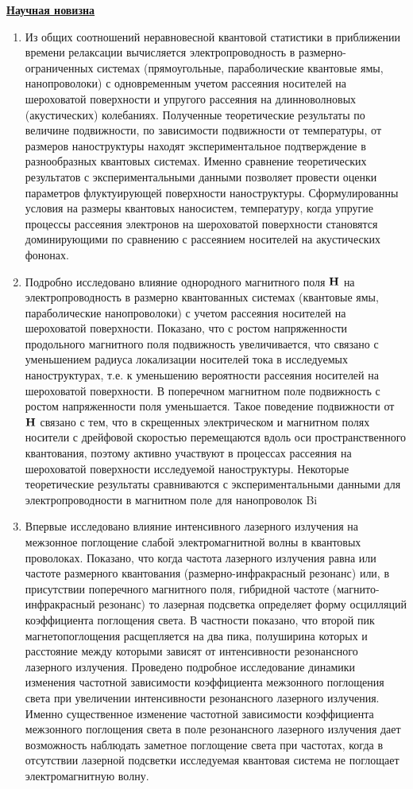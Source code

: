 \underline{\textbf{Научная новизна}}
\begin{enumerate}
	\item Из общих соотношений неравновесной квантовой статистики в приближении времени релаксации вычисляется электропроводность в размерно-ограниченных системах (прямоугольные, параболические квантовые ямы, нанопроволоки) с одновременным учетом рассеяния носителей на шероховатой поверхности и упругого рассеяния на длинноволновых (акустических) колебаниях. Полученные теоретические результаты по величине подвижности, по зависимости подвижности от температуры,  от размеров наноструктуры находят экспериментальное подтверждение в разнообразных квантовых системах. Именно сравнение теоретических результатов с экспериментальными данными позволяет провести оценки параметров флуктуирующей поверхности наноструктуры. Сформулированны условия на размеры квантовых наносистем, температуру, когда упругие процессы рассеяния электронов на шероховатой поверхности становятся доминирующими по сравнению с рассеянием носителей на акустических фононах.
	\item Подробно исследовано влияние однородного магнитного поля $\boldsymbol{\mathbf{H}}$ на электропроводность в размерно квантованных системах (квантовые ямы, параболические нанопроволоки) с учетом рассеяния носителей на шероховатой поверхности. Показано, что с ростом напряженности продольного магнитного поля подвижность увеличивается, что связано с уменьшением радиуса локализации носителей тока в исследуемых наноструктурах, т.е. к уменьшению вероятности рассеяния носителей на шероховатой поверхности. В поперечном магнитном поле подвижность с ростом напряженности поля уменьшается. Такое поведение подвижности от $\boldsymbol{\mathbf{H}}$ связано с тем, что в скрещенных электрическом и магнитном полях носители с дрейфовой скоростью перемещаются вдоль оси пространственного квантования, поэтому активно участвуют в процессах рассеяния на шероховатой поверхности исследуемой наноструктуры. Некоторые теоретические результаты сравниваются с экспериментальными данными для электропроводности в магнитном поле для нанопроволок Bi
	\item Впервые исследовано влияние интенсивного лазерного излучения на межзонное поглощение слабой электромагнитной волны в квантовых проволоках. Показано, что когда частота лазерного излучения равна или частоте размерного квантования (размерно-инфракрасный резонанс) или, в присутствии поперечного магнитного поля, гибридной частоте (магнито-инфракрасный резонанс) то лазерная подсветка определяет форму осцилляций коэффициента поглощения света. В частности показано, что второй пик магнетопоглощения расщепляется на два пика, полуширина которых и расстояние между которыми зависят от интенсивности резонансного лазерного излучения. Проведено подробное исследование динамики изменения частотной зависимости коэффициента межзонного поглощения света при увеличении интенсивности резонансного лазерного излучения. Именно существенное изменение частотной зависимости коэффициента межзонного поглощения света в поле резонансного лазерного излучения дает возможность наблюдать заметное поглощение света при частотах, когда в отсутствии лазерной подсветки исследуемая квантовая система не поглощает электромагнитную волну.

\end{enumerate}
